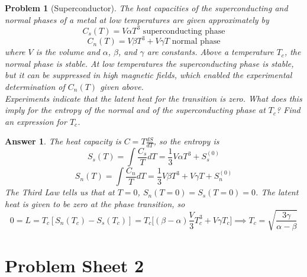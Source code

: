 \documentclass[a4paper]{article}
\newtheorem{ans}{Answer}[section]
\theoremstyle{new}
\newtheorem{qns}{Problem}[section]
\begin{document}
\newpage
\begin{qns}[Superconductor]
The heat capacities of the superconducting and normal phases of a metal at low temperatures are given approximately by
$$C_s(T)=V\alpha T^3\text{ superconducting phase}$$
$$C_n(T)=V\beta T^3+V\gamma T\text{ normal phase}$$
where $V$ is the volume and $\alpha$, $\beta$, and $\gamma$ are constants. Above a temperature $T_c$, the normal phase is stable. At low temperatures the superconducting phase is stable, but it can be suppressed in high magnetic fields, which enabled the experimental determination of $C_n(T)$ given above.\\[5pt]
Experiments indicate that the latent heat for the transition is zero. What does this imply for the entropy of the normal and of the superconducting phase at $T_c$? Find an expression for $T_c$.
\end{qns}
\begin{ans}
The heat capacity is $C=T\frac{dS}{dT}$, so the entropy is
$$S_{s}(T)=\int\frac{C_{s}}{T}dT=\frac{1}{3}V\alpha T^3+S^{(0)}_{s}$$
$$S_{n}(T)=\int\frac{C_{n}}{T}dT=\frac{1}{3}V\beta T^3+V\gamma T+S^{(0)}_{n}$$
The Third Law tells us that at $T=0$, $S_n(T=0)=S_s(T=0)=0$. The latent heat is given to be zero at the phase transition, so
$$0=L=T_c[S_n(T_c)-S_s(T_c)]=T_c\bigg[(\beta-\alpha)\frac{V}{3}T_c^3+V\gamma T_c\bigg]\implies T_c=\sqrt{\frac{3\gamma}{\alpha-\beta}}$$
\end{ans}
\newpage
\section{Problem Sheet 2}
\end{document}
